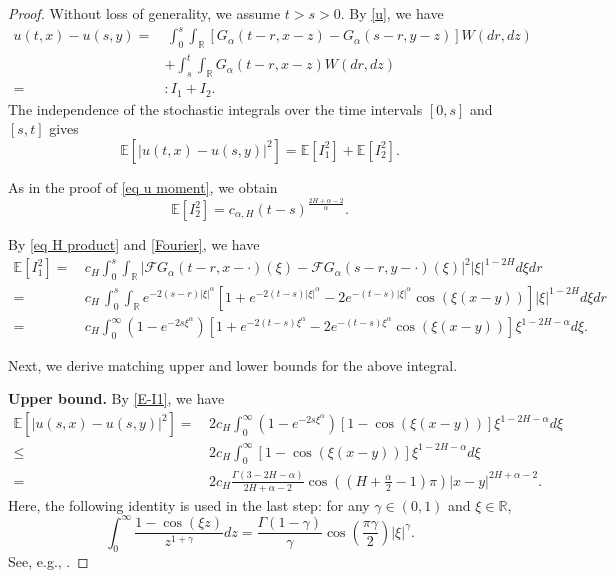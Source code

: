 \documentclass[11pt,reqno]{amsart}
\numberwithin{equation}{section}
\def\RR{\mathbb{R}}
\def\EE{\mathbb{E}}
\def\FF{\mathcal {F}}
\newcommand{\1}{{\bf 1}}
\newcommand{\2}{{\bf 2}}
\newcommand{\lc}{\left(}
\newcommand{\rc}{\right)}
\newcommand{\lk}{\left[}
\newcommand{\rk}{\right]}
\newcommand{\lt}{\left }
\newcommand{\rt}{\right}
\begin{document}
\begin{proof}
Without loss of generality, we assume $t>s>0$.
By \eqref{u}, we have
\begin{align*}
u(t,x)-u(s,y)=&\, \int_{0}^s\int_{\RR}\lk G_{\alpha}(t-r, x-z)-G_{\alpha}(s-r, y-z)\rk W(dr, dz)\\
&   +\int_{s}^t\int_{\RR} G_{\alpha}(t-r, x-z) W(dr, dz)\\
=&:I_1+I_2.
\end{align*}
The independence of the stochastic integrals over the time intervals $[0, s]$ and $[s, t]$  gives
\begin{equation}\label{d1 equality}
\EE\left[|u(t,x)-u(s,y)|^2\right]=\EE\left[I_1^2\right]+\EE\left[I_2^2\right].
\end{equation}

As in the proof of \eqref{eq u moment}, we obtain
\begin{equation}\label{E-I2}
\EE\left[I_2^2\right]= c_{\alpha, H}
(t-s)^{\frac {2H+\alpha-2}{\alpha}}.
\end{equation}

By \eqref{eq H product} and \eqref{Fourier},  we have
\begin{equation}\label{E-I1}
\begin{split}
\EE\left[I_1^2\right]=&\, c_{H}\int_{0}^s\int_{\RR}\lt|\FF G_{\alpha}(t-r, x-\cdot)(\xi)-\FF G_{\alpha}(s-r, y-\cdot)(\xi)\rt|^2   |\xi|^{1-2H}d\xi dr \\
 =& \, c_{H}\, \int_{0}^s\int_{\RR} e^{-2(s-r)|\xi|^{\alpha}}
\left[ 1+e^{-2(t-s)|\xi|^{\alpha}}-2e^{-(t-s)|\xi|^{\alpha}} \cos(\xi (x-y)) \right]  |\xi|^{1-2H}d\xi dr \\
= &\, c_{H}\int_{0}^{\infty} \lc 1-e^{-2s\xi^{\alpha}}\rc
     \left[ 1+e^{-2(t-s)\xi^{\alpha}}
       -2e^{-(t-s)\xi^{\alpha}}\cos(\xi(x-y))\right]   \xi^{1-2H-\alpha}d\xi.
       \end{split}
\end{equation}

Next, we derive matching upper and lower bounds for the above integral.

\noindent \textbf{Upper bound.}
By   \eqref{E-I1},  we have
\begin{equation}\label{x}
\begin{split}
\EE\left[\left|u(s,x)-u(s,y)\right|^2\right]
=&\,    2c_{H}\int_{0}^{\infty} \lc 1-e^{-2s\xi^{\alpha}}\rc
     \left[ 1-\cos(\xi(x-y))\right]  \xi^{1-2H-\alpha}d\xi \\
\leq&\,  2c_{H}  \int_{0}^{\infty}\left[ 1-\cos(\xi(x-y))\right]   \xi^{1-2H-\alpha}d\xi \\
=&\, 2c_{H} \frac{\Gamma(3-2H-\alpha)}{2H+\alpha-2}\cos\left(\left(H+\frac{\alpha}{2}-1\right)\pi\right) |x-y|^{2H+\alpha-2}.
\end{split}
\end{equation}
Here, the following identity  is used in the last step:
for any $\gamma\in(0,1)$ and $\xi\in\RR$,
\begin{equation}\label{cos}
\int_0^{\infty} \frac{1-\cos(\xi z)}{z^{1+\gamma}}dz= \frac{\Gamma(1-\gamma)}{\gamma}\cos\left(\frac{\pi\gamma}{2}\right) |\xi|^{\gamma}.
\end{equation}
See, e.g.,  \cite[Lemma D.1]{BJQ2015}.



\end{proof}
\end{document}
